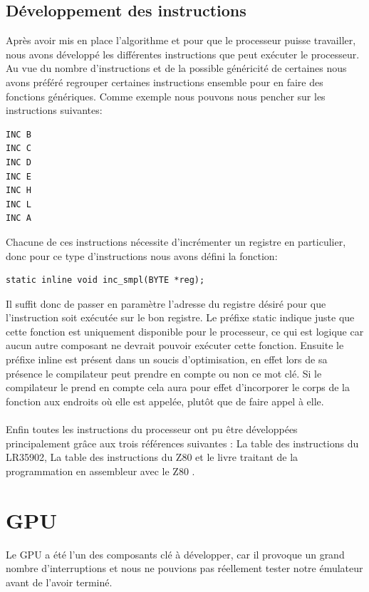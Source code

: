 \documentclass{report}
\begin{document}
\subsection{Développement des instructions}
Après avoir mis en place l'algorithme et pour que le processeur puisse travailler, nous avons développé les différentes instructions que peut exécuter le processeur. Au vue du nombre d'instructions et de la possible généricité de certaines nous avons préféré regrouper certaines instructions ensemble pour en faire des fonctions génériques. Comme exemple nous pouvons nous pencher sur les instructions suivantes:
\begin{lstlisting}
INC B
INC C
INC D
INC E
INC H
INC L
INC A
\end{lstlisting}
Chacune de ces instructions nécessite d'incrémenter un registre en particulier, donc pour ce type d'instructions nous avons défini la fonction:
\begin{lstlisting}
static inline void inc_smpl(BYTE *reg);
\end{lstlisting}
Il suffit donc de passer en paramètre l'adresse du registre désiré pour que l'instruction soit exécutée sur le bon registre.
Le préfixe static indique juste que cette fonction est uniquement disponible pour le processeur, ce qui est logique car aucun autre composant ne devrait pouvoir exécuter cette fonction. Ensuite le préfixe inline est présent dans un soucis d'optimisation, en effet lors de sa présence le compilateur peut prendre en compte ou non ce mot clé. Si le compilateur le prend en compte cela aura pour effet d'incorporer le corps de la fonction aux endroits où elle est appelée, plutôt que de faire appel à elle.\\\\ 
Enfin toutes les instructions du processeur ont pu être développées principalement grâce aux trois références suivantes :
La table des instructions du LR35902\cite{pastraiser}, La table des instructions du Z80\cite{clrhome} et le livre traitant de la programmation en assembleur avec le Z80 \cite{pinaud}.
\section{GPU}
Le GPU a été l'un des composants clé à développer, car il provoque un grand nombre d'interruptions et nous ne pouvions pas réellement tester notre émulateur avant de l'avoir terminé.\\
\end{document}
